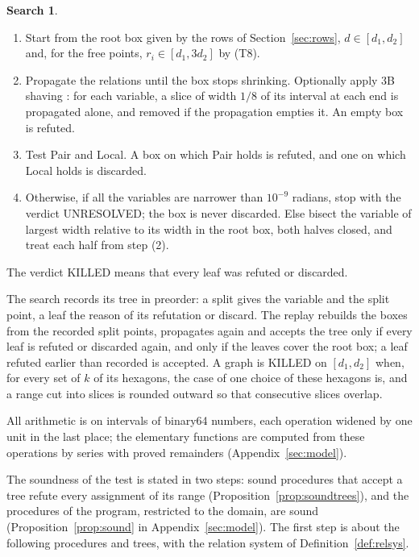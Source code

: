 \documentclass[12pt]{amsart}
\theoremstyle{definition}
\theoremstyle{plain}
\theoremstyle{definition}
\newtheorem{search}[theorem]{Search}
\newcommand{\mapnote}[1]{\ignorespaces}
\begin{document}
\begin{search}\label{alg:search}\mapnote{the search itself is not formalized; the formal proof reads its trees (Definition \ref{def:procs})}
\begin{enumerate}
\item Start from the root box given by the rows of Section~\ref{sec:rows}, $d\in[d_1,d_2]$ and, for the free points, $r_i\in[d_1,3d_2]$ by (T8).
\item Propagate the relations until the box stops shrinking. Optionally apply 3B shaving \cite{Lho}: for each variable, a slice of width $1/8$ of its interval at each end is propagated alone, and removed if the propagation empties it. An empty box is refuted.
\item Test Pair and Local. A box on which Pair holds is refuted, and one on which Local holds is discarded.
\item Otherwise, if all the variables are narrower than $10^{-9}$ radians, stop with the verdict UNRESOLVED; the box is never discarded. Else bisect the variable of largest width relative to its width in the root box, both halves closed, and treat each half from step (2).
\end{enumerate}
The verdict KILLED means that every leaf was refuted or discarded.
\end{search}

The search records its tree in preorder: a split gives the variable and the split point, a leaf the reason of its refutation or discard. The replay rebuilds the boxes from the recorded split points, propagates again and accepts the tree only if every leaf is refuted or discarded again, and only if the leaves cover the root box; a leaf refuted earlier than recorded is accepted. A graph is KILLED on $[d_1,d_2]$ when, for every set of $k$ of its hexagons, the case of one choice of these hexagons is, and a range cut into slices is rounded outward so that consecutive slices overlap.

All arithmetic is on intervals of binary64 numbers, each operation widened by one unit in the last place; the elementary functions are computed from these operations by series with proved remainders (Appendix~\ref{sec:model}).

The soundness of the test is stated in two steps: sound procedures that accept a tree refute every assignment of its range (Proposition~\ref{prop:soundtrees}), and the procedures of the program, restricted to the domain, are sound (Proposition~\ref{prop:sound} in Appendix~\ref{sec:model}). The first step is about the following procedures and trees, with the relation system of Definition~\ref{def:relsys}.
\end{document}
